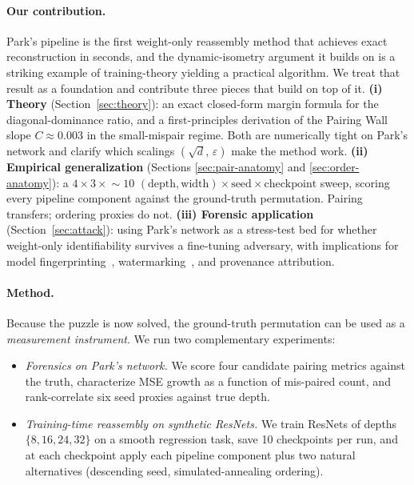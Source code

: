 \documentclass[10pt]{article}
\theoremstyle{remark}
\begin{document}
\paragraph{Our contribution.} Park's pipeline is the first
weight-only reassembly method that achieves exact reconstruction in
seconds, and the dynamic-isometry argument it builds on is a striking
example of training-theory yielding a practical algorithm. We treat that
result as a foundation and contribute three pieces that build on top of
it. \textbf{(i) Theory} (Section~\ref{sec:theory}): an exact closed-form
margin formula for the diagonal-dominance ratio, and a first-principles
derivation of the Pairing Wall slope $C\approx 0.003$ in the
small-mispair regime. Both are numerically tight on Park's network and
clarify which scalings $(\sqrt{d},\,\varepsilon)$ make the method work.
\textbf{(ii) Empirical generalization} (Sections \ref{sec:pair-anatomy}
and \ref{sec:order-anatomy}): a $4\!\times\!3\!\times\!{\sim}10$
$(\text{depth},\text{width})\times\text{seed}\times\text{checkpoint}$
sweep, scoring every pipeline component against the ground-truth
permutation. Pairing transfers; ordering proxies do not.
\textbf{(iii) Forensic application} (Section~\ref{sec:attack}): using
Park's network as a stress-test bed for whether weight-only
identifiability survives a fine-tuning adversary, with implications
for model fingerprinting~\cite{lukas2022deep},
watermarking~\cite{adi2018turning}, and provenance attribution.

\paragraph{Method.} Because the puzzle is now solved, the ground-truth
permutation can be used as a \emph{measurement instrument}. We run two
complementary experiments:
\begin{itemize}[leftmargin=*,itemsep=0pt]
  \item \emph{Forensics on Park's network.} We score four candidate
        pairing metrics against the truth, characterize MSE growth as a
        function of mis-paired count, and rank-correlate six seed
        proxies against true depth.
  \item \emph{Training-time reassembly on synthetic ResNets.} We train
        ResNets of depths $\{8, 16, 24, 32\}$ on a smooth regression
        task, save 10 checkpoints per run, and at each checkpoint apply
        each pipeline component plus two natural alternatives
        (descending seed, simulated-annealing ordering).
\end{itemize}
\end{document}

